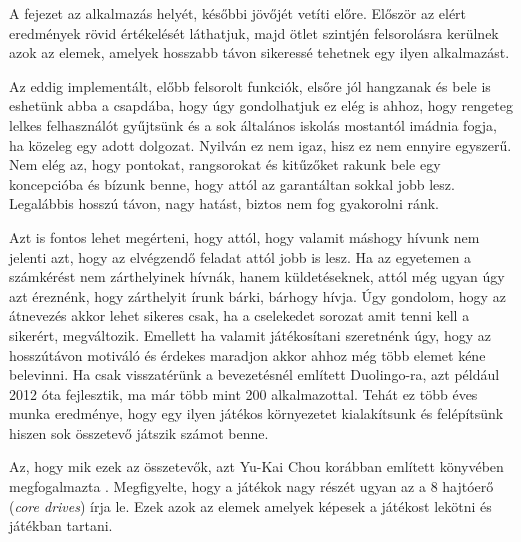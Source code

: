
A fejezet az alkalmazás helyét, későbbi jövőjét vetíti előre. Először az elért eredmények rövid értékelését láthatjuk, majd ötlet szintjén felsorolásra kerülnek azok az elemek, amelyek hosszabb távon sikeressé tehetnek egy ilyen alkalmazást.


Az eddig implementált, előbb felsorolt funkciók, elsőre jól hangzanak és bele is eshetünk abba a csapdába, hogy úgy gondolhatjuk ez elég is ahhoz, hogy rengeteg lelkes felhasználót gyűjtsünk és a sok általános iskolás mostantól imádnia fogja, ha közeleg egy adott dolgozat. Nyilván ez nem igaz, hisz ez nem ennyire egyszerű. Nem elég az, hogy pontokat, rangsorokat és kitűzőket rakunk bele egy koncepcióba és bízunk benne, hogy attól az garantáltan sokkal jobb lesz. Legalábbis hosszú távon, nagy hatást, biztos nem fog gyakorolni ránk. \newline

Azt is fontos lehet megérteni, hogy attól, hogy valamit máshogy hívunk nem jelenti azt, hogy az elvégzendő feladat attól jobb is lesz. Ha az egyetemen a számkérést nem zárthelyinek hívnák, hanem küldetéseknek, attól még ugyan úgy azt éreznénk, hogy zárthelyit írunk bárki, bárhogy hívja. Úgy gondolom, hogy az átnevezés akkor lehet sikeres csak, ha a cselekedet sorozat amit tenni kell a sikerért, megváltozik. Emellett ha valamit játékosítani szeretnénk úgy, hogy az hosszútávon motiváló és érdekes maradjon akkor ahhoz még több elemet kéne belevinni. Ha csak visszatérünk a bevezetésnél említett Duolingo-ra, azt például 2012 óta fejlesztik, ma már több mint 200 alkalmazottal. Tehát ez több éves munka eredménye, hogy egy ilyen játékos környezetet kialakítsunk és felépítsünk hiszen sok összetevő játszik számot benne. \newline

Az, hogy mik ezek az összetevők, azt Yu-Kai Chou korábban említett könyvében megfogalmazta \cite{actionablegamification}. Megfigyelte, hogy a játékok nagy részét ugyan az a 8 hajtóerő (\textit{core drives}) írja le. Ezek azok az elemek amelyek képesek a játékost lekötni és játékban tartani.

